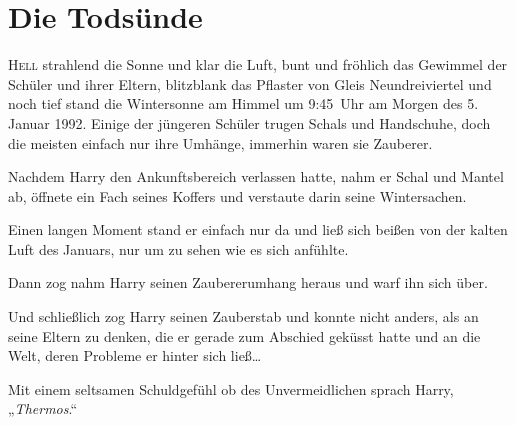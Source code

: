 \chapter{Die Todsünde}

\lettrine{H}{ell} strahlend die Sonne und klar die Luft, bunt und fröhlich das Gewimmel der Schüler und ihrer Eltern, blitzblank das Pflaster von Gleis Neundreiviertel und noch tief stand die Wintersonne am Himmel um 9:45~Uhr am Morgen des 5. Januar 1992. Einige der jüngeren Schüler trugen Schals und Handschuhe, doch die meisten einfach nur ihre Umhänge, immerhin waren sie Zauberer.

Nachdem Harry den Ankunftsbereich verlassen hatte, nahm er Schal und Mantel ab, öffnete ein Fach seines Koffers und verstaute darin seine Wintersachen.

Einen langen Moment stand er einfach nur da und ließ sich beißen von der kalten Luft des Januars, nur um zu sehen wie es sich anfühlte.

Dann zog nahm Harry seinen Zaubererumhang heraus und warf ihn sich über.

Und schließlich zog Harry seinen Zauberstab und konnte nicht anders, als an seine Eltern zu denken, die er gerade zum Abschied geküsst hatte und an die Welt, deren Probleme er hinter sich ließ…

Mit einem seltsamen Schuldgefühl ob des Unvermeidlichen sprach Harry, „\emph{Thermos}.“


